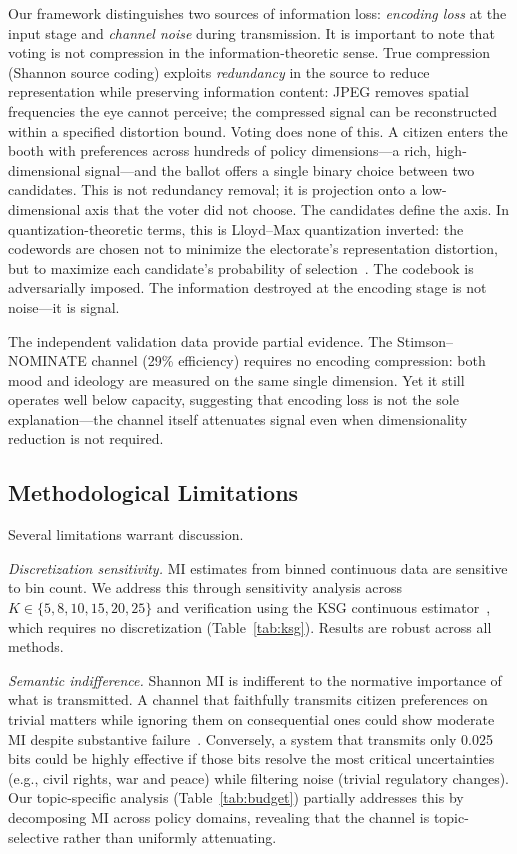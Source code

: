 \documentclass[twocolumn,10pt]{article}
\begin{document}
Our framework distinguishes two sources of information loss: \emph{encoding loss} at the input stage and \emph{channel noise} during transmission.  It is important to note that voting is not compression in the information-theoretic sense.  True compression (Shannon source coding) exploits \emph{redundancy} in the source to reduce representation while preserving information content: JPEG removes spatial frequencies the eye cannot perceive; the compressed signal can be reconstructed within a specified distortion bound.  Voting does none of this.  A citizen enters the booth with preferences across hundreds of policy dimensions---a rich, high-dimensional signal---and the ballot offers a single binary choice between two candidates.  This is not redundancy removal; it is projection onto a low-dimensional axis that the voter did not choose.  The candidates define the axis.  In quantization-theoretic terms, this is Lloyd--Max quantization inverted: the codewords are chosen not to minimize the electorate's representation distortion, but to maximize each candidate's probability of selection~\citep{cover2006}.  The codebook is adversarially imposed.  The information destroyed at the encoding stage is not noise---it is signal.

The independent validation data provide partial evidence.  The Stimson--NOMINATE channel (29\% efficiency) requires no encoding compression: both mood and ideology are measured on the same single dimension.  Yet it still operates well below capacity, suggesting that encoding loss is not the sole explanation---the channel itself attenuates signal even when dimensionality reduction is not required.

\subsection{Methodological Limitations}
\label{sec:limitations}

Several limitations warrant discussion.

\emph{Discretization sensitivity.}  MI estimates from binned continuous data are sensitive to bin count.  We address this through sensitivity analysis across $K \in \{5, 8, 10, 15, 20, 25\}$ and verification using the KSG continuous estimator~\citep{kraskov2004}, which requires no discretization (Table~\ref{tab:ksg}).  Results are robust across all methods.

\emph{Semantic indifference.}  Shannon MI is indifferent to the normative importance of what is transmitted.  A channel that faithfully transmits citizen preferences on trivial matters while ignoring them on consequential ones could show moderate MI despite substantive failure~\citep{cover2006}.  Conversely, a system that transmits only 0.025 bits could be highly effective if those bits resolve the most critical uncertainties (e.g., civil rights, war and peace) while filtering noise (trivial regulatory changes).  Our topic-specific analysis (Table~\ref{tab:budget}) partially addresses this by decomposing MI across policy domains, revealing that the channel is topic-selective rather than uniformly attenuating.
\end{document}
